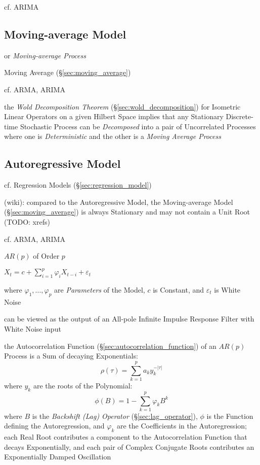 cf. ARIMA



\subsection{Moving-average Model}\label{sec:moving_average_model}

or \emph{Moving-average Process}

Moving Average (\S\ref{sec:moving_average})

cf. ARMA, ARIMA

the \emph{Wold Decomposition Theorem} (\S\ref{sec:wold_decomposition}) for
Isometric Linear Operators on a given Hilbert Space implies that any Stationary
Discrete-time Stochastic Process can be \emph{Decomposed} into a pair of
Uncorrelated Processes where one is \emph{Deterministic} and the other is a
\emph{Moving Average Process}



\subsection{Autoregressive Model}\label{sec:autoregressive_model}

cf. Regression Models (\S\ref{sec:regression_model})

(wiki): compared to the Autoregressive Model, the Moving-average Model
(\S\ref{sec:moving_average}) is always Stationary and may not contain a Unit
Root (TODO: xrefs)

cf. ARMA, ARIMA

$AR(p)$ of Order $p$

$X_t = c + \sum_{i=1}^p \varphi_i X_{t-i} + \varepsilon_t$

where $\varphi_1, \ldots, \varphi_p$ are \emph{Parameters} of the Model, $c$ is
Constant, and $\varepsilon_t$ is White Noise

can be viewed as the output of an All-pole Infinite Impulse Response Filter with
White Noise input

the Autocorrelation Function (\S\ref{sec:autocorrelation_function}) of an
$AR(p)$ Process is a Sum of decaying Exponentials:
\[
  \rho(\tau) = \sum_{k=1}^p a_k y_k^{-|\tau|}
\]
where $y_k$ are the roots of the Polynomial:
\[
  \phi(B) = 1 - \sum_{k=1}^p \varphi_k B^k
\]
where $B$ is the \emph{Backshift (Lag) Operator} (\S\ref{sec:lag_operator}),
$\phi$ is the Function defining the Autoregression, and $\varphi_k$ are the
Coefficients in the Autoregression;
each Real Root contributes a component to the Autocorrelation Function that
decays Exponentially, and each pair of Complex Conjugate Roots contributes an
Exponentially Damped Oscillation


